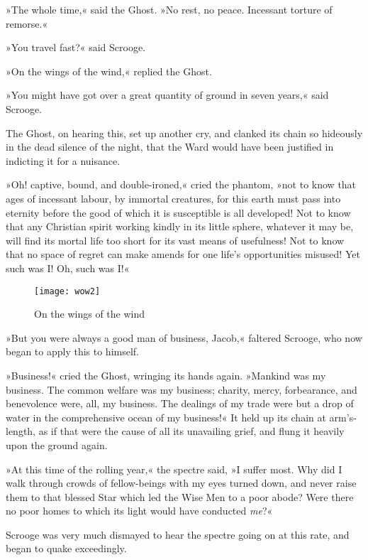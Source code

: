 »The whole time,« said the Ghost. »No rest, no peace. Incessant torture of remorse.«

»You travel fast?« said Scrooge.

»On the wings of the wind,« replied the Ghost. 

»You might have got over a great quantity of ground in seven years,« said Scrooge.



The Ghost, on hearing this, set up another cry, and clanked its chain so hideously in the dead silence of the night, that the Ward would have been justified in indicting it for a nuisance.



»Oh! captive, bound, and double-ironed,« cried the phantom, »not to know that ages of incessant labour, by immortal creatures, for this earth must pass into eternity before the good of which it is susceptible is all developed! Not to know that any Christian spirit working kindly in its little sphere, whatever it may be, will find its mortal life too short for its vast means of usefulness! Not to know that no space of regret can make amends for one life's opportunities misused! Yet such was I\@! Oh, such was I\@!«

\begin{a4}
	\begin{figure}[b!]
		\centering
		\texttt{[image: wow2]}
		\caption{On the wings of the wind}
	\end{figure}
\end{a4}

»But you were always a good man of business, Jacob,« faltered Scrooge, who now began to apply this to himself.

»Business!« cried the Ghost, wringing its hands again. »Mankind was my business. The common welfare was my business; charity, mercy, forbearance, and benevolence were, all, my business. The dealings of my trade were but a drop of water in the comprehensive ocean of my business!«
It held up its chain at arm's-length, as if that were the cause of all its unavailing grief, and flung it heavily upon the ground again.

»At this time of the rolling year,« the spectre said, »I suffer most. Why did I walk through crowds of fellow-beings with my eyes turned down, and never raise them to that blessed Star which led the Wise Men to a poor abode? Were there no poor homes to which its light would have conducted \textit{me}?«

Scrooge was very much dismayed to hear the spectre going on at this rate, and began to quake exceedingly.

